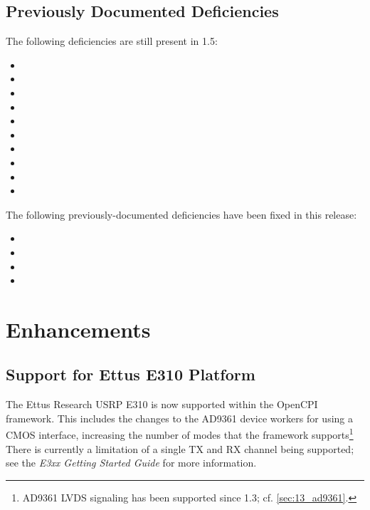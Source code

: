 \subsection{Previously Documented Deficiencies}
The following deficiencies are still present in 1.5:
\begin{itemize}
\setlength\itemsep{0em} %
\item {}
\item {}
\item {}
\item {}
\item {}
\item {}
\item {}
\item {}
\item {}
\item {}
\end{itemize}

The following previously-documented deficiencies have been fixed in this release:
\begin{itemize}
\setlength\itemsep{0em} %
\item {}
\item {}
\item {}
\item {}
\end{itemize}


\beginoldnotes

\section{Enhancements}

\subsection{Support for Ettus E310 Platform} %
\label{sec:14_e310}
The Ettus Research USRP E310 is now supported within the OpenCPI framework. This includes the changes to the AD9361 device workers for using a CMOS interface, increasing the number of modes that the framework supports\footnote{AD9361 LVDS signaling has been supported since 1.3; cf. \ref{sec:13_ad9361}.} There is currently a limitation of a single TX and RX channel being supported; see the \textit{E3xx Getting Started Guide} for more information.

